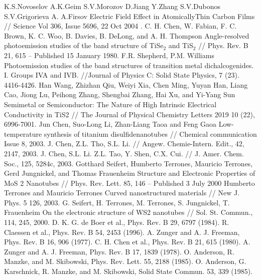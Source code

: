 
\begin{thebibliography}{3}
K.S.Novoselov A.K.Geim S.V.Morozov D.Jiang Y.Zhang S.V.Dubonos S.V.Grigorieva A. A.Firsov Electric Field Effect in AtomicallyThin Carbon Films // Science Vol 306, Issue 5696, 22 Oct 2004 .
 C. H. Chen, W. Fabian, F. C. Brown, K. C. Woo, B. Davies, B. DeLong, and A. H. Thompson
Angle-resolved photoemission studies of the band structure of TiSe$_{2}$ and TiS$_{2}$ // Phys. Rev. B 21, 615 – Published 15 January 1980.
 F.R. Shepherd, P.M. Williams Photoemission studies of the band structures of transition metal dichalcogenides. I. Groups IVA and IVB. //Journal of Physics C: Solid State Physics, 7 (23). 4416-4426.
 Han Wang, Zhizhan Qiu, Weiyi Xia, Chen Ming, Yuyan Han, Liang Cao, Jiong Lu, Peihong Zhang, Shengbai Zhang, Hai Xu, and Yi-Yang Sun Semimetal or Semiconductor: The Nature of High Intrinsic Electrical Conductivity in TiS2 // The Journal of Physical Chemistry Letters 2019 10 (22), 6996-7001.
 Jun Chen, Suo-Long Li, Zhan-Liang Taoa and Feng Gaoa Low-temperature synthesis of titanium disulfidenanotubes //  Chemical communication Issue 8, 2003.
 J. Chen, Z.L. Tho, S.L. Li. // Angew. Chemie-Intern. Edit., 42, 2147, 2003.
 J. Chen, S.L. Li. Z.L. Tao, Y. Shen, C.X. Cui. // J. Amer. Chem. Soc., 125, 5284c, 2003.
 Gotthard Seifert, Humberto Terrones, Mauricio Terrones, Gerd Jungnickel, and Thomas Frauenheim Structure and Electronic Properties of MoS 2 Nanotubes // Phys. Rev. Lett. 85, 146 – Published 3 July 2000
 Humberto Terrones and Mauricio Terrones Curved nanostructured materials // New J. Phys. 5 126, 2003.
 G. Seifert, H. Terrones, M. Terrones, S. Jungnickel, T. Frauenheim On the electronic structure of WS2 nanotubes //  Sol. St. Commun., 114, 245, 2000.
D. K. G. de Boer et al., Phys. Rev. B 29, 6797 (1984).
R. Claessen et al., Phys. Rev. B 54, 2453 (1996).
A. Zunger and A. J. Freeman, Phys. Rev. B 16, 906 (1977).
C. H. Chen et al., Phys. Rev. B 21, 615 (1980).
A. Zunger and A. J. Freeman, Phys. Rev. B 17, 1839 (1978).
O. Anderson, R. Manzke, and M. Skibowski, Phys. Rev. Lett. 55, 2188 (1985).
O. Anderson, G. Karschnick, R. Manzke, and M. Skibowski, Solid State Commun. 53, 339 (1985).

\end{thebibliography}
